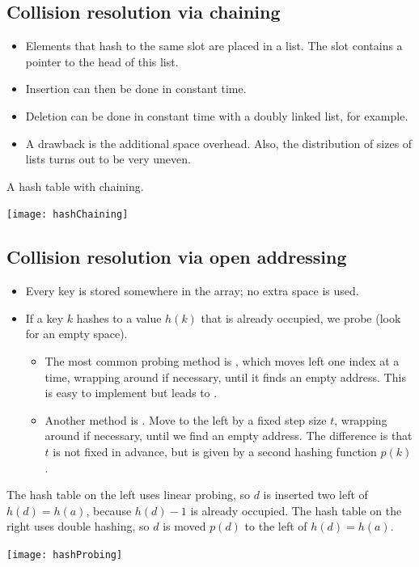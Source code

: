 \subsection{Collision resolution via chaining}
\begin{itemize}
\item Elements that hash to the same slot are placed in a list. 
The slot contains a pointer to the head of this list. 
\item Insertion can then be done in constant time. 
\item Deletion can be done in constant time with a doubly linked list, for example. 
\item A drawback is the additional space overhead. Also, the distribution of 
sizes of lists turns out to be very uneven.
\end{itemize}

\begin{Boxample}
A hash table with chaining.
\begin{center}
\texttt{[image: hashChaining]} 
\end{center}
\end{Boxample}


\subsection{Collision resolution via open addressing}
\begin{itemize}
	\item Every key is stored somewhere in the array; no extra space is used.
	\item If a key  $k$ hashes to a value $h(k)$ that is already occupied, 
	we probe (look for an empty space). 
	\begin{itemize}
		\item The most common probing method is , which moves left
		 one index at a time, wrapping around if necessary, until it finds an empty 
		 address. This is easy to implement but leads to .
		\item Another method is . Move to the left by a
		fixed step size $t$, wrapping around if necessary, until we find an
		empty address. The difference is that $t$ is not fixed in advance, but
		is given by a second hashing function $p(k)$.
	\end{itemize}
\end{itemize}

\begin{Boxample}
The hash table on the left uses linear probing, so $d$ is inserted two left of $h(d) = h(a)$, because $h(d)-1$ is already occupied.
The hash table on the right uses double hashing, so $d$ is moved $p(d)$ to the left of $h(d) = h(a)$. 
\begin{center}
\texttt{[image: hashProbing]} 
\end{center}
\end{Boxample}


